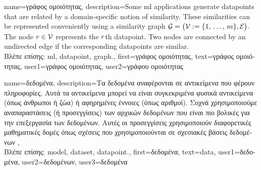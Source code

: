  {name={\foreignlanguage{greek}{γράφος ομοιότητας}}, 
 	description={Some \gls{ml} applications generate \gls{datapoint}s that 
 		are related by a domain-specific notion of similarity. These similarities can be 
 		represented conveniently using a similarity \gls{graph} $\mathcal{G} = \big(\mathcal{V} := \{1, \,\ldots, \,m\},\mathcal{E}\big)$. 
 		The node $r \in \mathcal{V}$ represents the $r$th \gls{datapoint}. Two 
 		nodes are connected by an undirected edge if the corresponding \gls{datapoint}s are similar.\\
		\foreignlanguage{greek}{Βλέπε επίσης:} \gls{ml}, \gls{datapoint}, \gls{graph}.},
 	first={\foreignlanguage{greek}{γράφος ομοιότητας}},
	text={\foreignlanguage{greek}{γράφος ομοιότητας}},
	user1={\foreignlanguage{greek}{γράφος ομοιότητας}}, %
  	user2={\foreignlanguage{greek}{γράφου ομοιότητας}} %
}

{name={\foreignlanguage{greek}{δεδομένα}},
	 description={\foreignlanguage{greek}{Τα δεδομένα αναφέρονται σε αντικείμενα που φέρουν} 
	 	\foreignlanguage{greek}{πληροφορίες. Αυτά τα αντικείμενα μπορεί να είναι συγκεκριμένα φυσικά αντικείμενα 
		(όπως άνθρωποι ή ζώα) ή αφηρημένες έννοιες (όπως αριθμοί).  Συχνά χρησιμοποιούμε αναπαραστάσεις (ή 
	 	προσεγγίσεις) των αρχικών δεδομένων που είναι πιο βολικές για την επεξεργασία των δεδομένων. 
		Αυτές οι προσεγγίσεις χρησιμοποιούν διαφορετικές μαθηματικές δομές όπως σχέσεις που χρησιμοποιούνται 
		σε σχεσιακές βάσεις δεδομένων} \cite{codd1970relational}, \cite{silberschatz2019database}\\
		\foreignlanguage{greek}{Βλέπε επίσης:} \gls{model}, \gls{dataset}, \gls{datapoint}.}, 
	first={\foreignlanguage{greek}{δεδομένα}},
	text={data},
	user1={\foreignlanguage{greek}{δεδομένα}}, %
  	user2={\foreignlanguage{greek}{δεδομένων}}, %
	user3={\foreignlanguage{greek}{δεδομένα}} %
}

